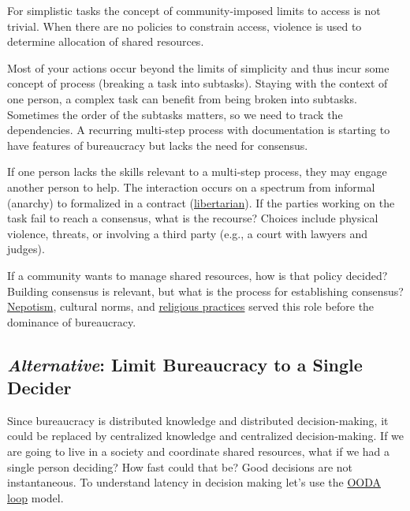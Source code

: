 For simplistic tasks the concept of community-imposed limits to access 
\iftoggle{glossarysubstitutionworks}{\glspl{shared resource}}{shared resources}
\iftoggle{glossaryinmargin}{\marginpar{[Glossary]}}{} is not trivial. When there are no policies to constrain access, violence is used to determine allocation of shared resources.

Most of your actions occur beyond the limits of simplicity and thus incur some concept of \gls{process}
\iftoggle{glossaryinmargin}{\marginpar{[Glossary]}}{} (breaking a task into subtasks). Staying with the context of one person, a complex task can benefit from being broken into subtasks. Sometimes the order of the subtasks matters, so we need to track the dependencies. A recurring multi-step process with documentation is starting to have features of bureaucracy but lacks the need for consensus. 


If one person lacks the skills relevant to a multi-step process, they may engage another person to help. The interaction occurs on a spectrum from informal (anarchy) to formalized in a contract (\href{https://en.wikipedia.org/wiki/Libertarianism}{libertarian}).
\iftoggle{WPinmargin}{\marginpar{$>$Wikipedia: libertarian}}{}
If the parties working on the task fail to reach a consensus, what is the recourse? Choices include physical violence, threats, or involving a third party (e.g., a court with lawyers and judges). 


If a community wants to manage shared resources, how is that policy decided?  Building consensus is relevant, but what is the process for establishing consensus? 
\href{https://en.wikipedia.org/wiki/Nepotism}{Nepotism},
\iftoggle{WPinmargin}{\marginpar{$>$Wikipedia: Nepotism}}{}
cultural norms, and 
\href{https://en.wikipedia.org/wiki/Religion}{religious practices}
served this role before the dominance of bureaucracy. 


\subsection*{\textit{Alternative}: Limit Bureaucracy to a Single Decider\label{sec:single-decider}}

Since bureaucracy is distributed knowledge and distributed decision-making, it could be replaced by centralized knowledge and centralized decision-making. If we are going to live in a society and coordinate shared resources, what if we had a single person deciding? How fast could that be? Good decisions are not instantaneous. To understand latency in decision making let's use the
\href{https://en.wikipedia.org/wiki/OODA_loop}{OODA loop} 
\iftoggle{WPinmargin}{\marginpar{$>$Wikipedia: OODA loop}}{}
model. 

